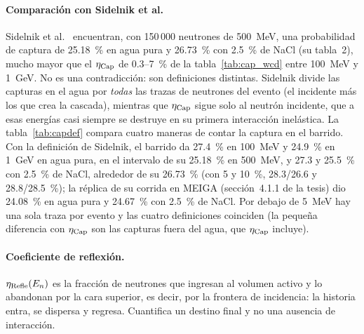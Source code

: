 \documentclass[11pt,a4paper]{article}
\newcommand{\tabla}[1]{}
\begin{document}
\paragraph{Comparación con Sidelnik et al.} Sidelnik et al.~\cite{Sidelnik2020} encuentran, con 150\,000
neutrones de 500~MeV, una probabilidad de captura de 25.18~\% en agua pura y 26.73~\% con 2.5~\% de NaCl (su tabla~2),
mucho mayor que el $\eta_{\rm Cap}$ de 0.3--7~\% de la tabla~\ref{tab:cap_wcd} entre 100~MeV y 1~GeV. No es una
contradicción: son definiciones distintas. Sidelnik divide las capturas en el agua por \emph{todas} las trazas de
neutrones del evento (el incidente más los que crea la cascada), mientras que $\eta_{\rm Cap}$ sigue solo al neutrón
incidente, que a esas energías casi siempre se destruye en su primera interacción inelástica. La
tabla~\ref{tab:capdef} compara cuatro maneras de contar la captura en el barrido. Con la definición de Sidelnik, el
barrido da 27.4~\% en 100~MeV y 24.9~\% en 1~GeV en agua pura, en el intervalo de su 25.18~\% en 500~MeV, y 27.3 y 25.5~\% con 2.5~\% de NaCl, alrededor de su 26.73~\% (con 5 y
10~\%, 28.3/26.6 y 28.8/28.5~\%); la réplica de
su corrida en MEIGA (sección~4.1.1 de la tesis) dio 24.08~\% en agua pura y 24.67~\% con 2.5~\% de NaCl. Por debajo de
5~MeV hay una sola traza por evento y las cuatro definiciones coinciden (la pequeña diferencia con $\eta_{\rm Cap}$ son
las capturas fuera del agua, que $\eta_{\rm Cap}$ incluye).

\begin{table}[H]
	\centering
	\caption{Cuatro definiciones de la captura en el barrido rápido: $\eta_{\rm Cap}$ (destino del neutrón incidente,
		dentro o fuera del agua); capturas en el agua por traza de neutrón del evento (definición de Sidelnik et
		al.~\cite{Sidelnik2020}); capturas en el agua por neutrón incidente (puede superar el 100~\%); y fracción de eventos con
		al menos una captura en el agua. Se dan también las trazas de neutrones por neutrón incidente.}\label{tab:capdef}	
	\footnotesize\setlength\tabcolsep{3.5pt}
\tabla{capturas_definiciones}
\end{table}

\paragraph{Coeficiente de reflexión.} $\eta_{\rm Refle}(E_n)$ es la fracción de neutrones que ingresan al volumen
activo y lo abandonan por la cara superior, es decir, por la frontera de incidencia: la historia entra, se dispersa y
regresa. Cuantifica un destino final y no una ausencia de interacción.
\end{document}
